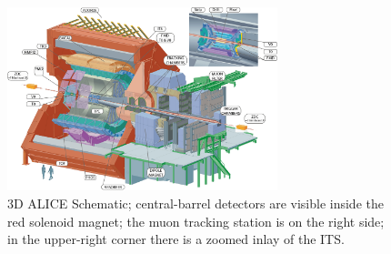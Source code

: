 \documentclass[12pt, a4paper, twoside, titlepage]{article}
\begin{document}
\begin{figure}[tbh]
\begin{center}
\includegraphics[width=0.7\textwidth]{img/alice}
 \caption{3D ALICE Schematic; central-barrel detectors are visible inside the red solenoid magnet;
 the muon tracking station is on the right side; in the upper-right corner there is a zoomed inlay of the ITS.} 
 \label{fig:alice}
\end{center}
\end{figure}
\end{document}
